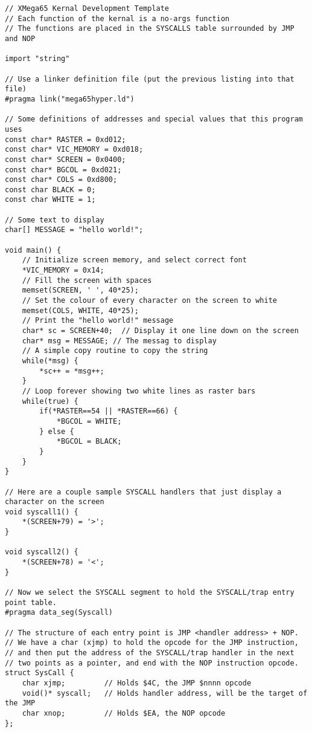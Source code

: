 \begin{tcolorbox}[colback=black,coltext=white]
\verbatimfont{\codefont}
\begin{verbatim}
// XMega65 Kernal Development Template
// Each function of the kernal is a no-args function
// The functions are placed in the SYSCALLS table surrounded by JMP and NOP

import "string"

// Use a linker definition file (put the previous listing into that file)
#pragma link("mega65hyper.ld")

// Some definitions of addresses and special values that this program uses
const char* RASTER = 0xd012;
const char* VIC_MEMORY = 0xd018;
const char* SCREEN = 0x0400;
const char* BGCOL = 0xd021;
const char* COLS = 0xd800;
const char BLACK = 0;
const char WHITE = 1;

// Some text to display
char[] MESSAGE = "hello world!";

void main() {
    // Initialize screen memory, and select correct font
    *VIC_MEMORY = 0x14;
    // Fill the screen with spaces
    memset(SCREEN, ' ', 40*25);
    // Set the colour of every character on the screen to white
    memset(COLS, WHITE, 40*25);
    // Print the "hello world!" message
    char* sc = SCREEN+40;  // Display it one line down on the screen
    char* msg = MESSAGE; // The messag to display
    // A simple copy routine to copy the string
    while(*msg) {
        *sc++ = *msg++;
    }
    // Loop forever showing two white lines as raster bars
    while(true) {
        if(*RASTER==54 || *RASTER==66) {
            *BGCOL = WHITE;
        } else {
            *BGCOL = BLACK;
        }
    }
}

// Here are a couple sample SYSCALL handlers that just display a character on the screen
void syscall1() {
    *(SCREEN+79) = '>';
}

void syscall2() {
    *(SCREEN+78) = '<';
}

// Now we select the SYSCALL segment to hold the SYSCALL/trap entry point table.
#pragma data_seg(Syscall)

// The structure of each entry point is JMP <handler address> + NOP.
// We have a char (xjmp) to hold the opcode for the JMP instruction,
// and then put the address of the SYSCALL/trap handler in the next
// two points as a pointer, and end with the NOP instruction opcode.
struct SysCall {
    char xjmp;         // Holds $4C, the JMP $nnnn opcode
    void()* syscall;   // Holds handler address, will be the target of the JMP
    char xnop;         // Holds $EA, the NOP opcode
};


\end{verbatim}
\end{tcolorbox}

